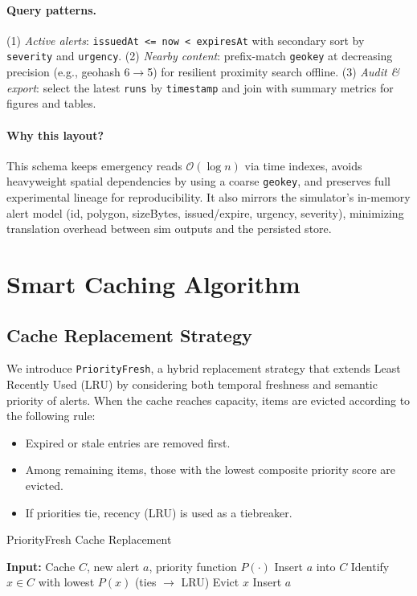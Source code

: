 \documentclass[11pt,twocolumn]{article}
\begin{document}
\paragraph{Query patterns.}
(1) \emph{Active alerts}: \texttt{issuedAt <= now < expiresAt} with secondary sort by \texttt{severity} and \texttt{urgency}. (2) \emph{Nearby content}: prefix-match \texttt{geokey} at decreasing precision (e.g., geohash 6$\rightarrow$5) for resilient proximity search offline. (3) \emph{Audit \& export}: select the latest \texttt{runs} by \texttt{timestamp} and join with summary metrics for figures and tables.

\paragraph{Why this layout?}
This schema keeps emergency reads $\mathcal{O}(\log n)$ via time indexes, avoids heavyweight spatial dependencies by using a coarse \texttt{geokey}, and preserves full experimental lineage for reproducibility. It also mirrors the simulator’s in-memory alert model (id, polygon, sizeBytes, issued/expire, urgency, severity), minimizing translation overhead between sim outputs and the persisted store.

\section{Smart Caching Algorithm}

\subsection{Cache Replacement Strategy}

We introduce \texttt{PriorityFresh}, a hybrid replacement strategy that extends Least Recently Used (LRU) by considering both temporal freshness and semantic priority of alerts. When the cache reaches capacity, items are evicted according to the following rule: 
\begin{itemize}
    \item Expired or stale entries are removed first.
    \item Among remaining items, those with the lowest composite priority score are evicted.
    \item If priorities tie, recency (LRU) is used as a tiebreaker.
\end{itemize}

\begin{algorithm}[h]
\caption{PriorityFresh Cache Replacement}
\begin{algorithmic}[1]
\STATE \textbf{Input:} Cache $C$, new alert $a$, priority function $P(\cdot)$
    \STATE Insert $a$ into $C$
\ELSE
    \STATE Identify $x \in C$ with lowest $P(x)$ (ties $\rightarrow$ LRU)
    \STATE Evict $x$
    \STATE Insert $a$
\ENDIF
\end{algorithmic}
\end{algorithm}
\end{document}
